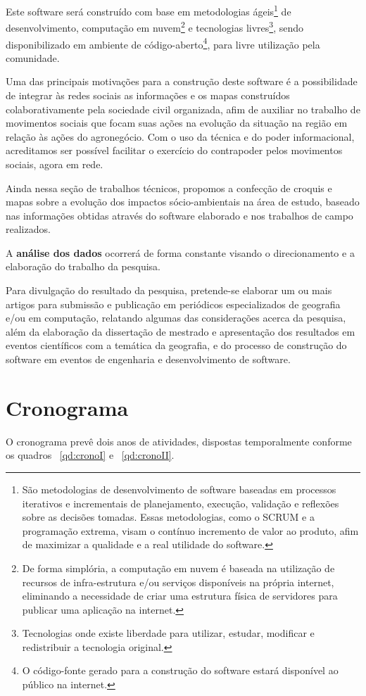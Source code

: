 Este software será construído com base em metodologias ágeis\footnote{São metodologias de desenvolvimento de software baseadas em processos iterativos e incrementais de planejamento, execução, validação e reflexões sobre as decisões tomadas. Essas metodologias, como o SCRUM e a programação extrema, visam o contínuo incremento de valor ao produto, afim de maximizar a qualidade e a real utilidade do software.} de desenvolvimento, computação em nuvem\footnote{De forma simplória, a computação em nuvem é baseada na utilização de recursos de infra-estrutura e/ou serviços disponíveis na própria internet, eliminando a necessidade de criar uma estrutura física de servidores para publicar uma aplicação na internet.} e tecnologias livres\footnote{Tecnologias onde existe liberdade para utilizar, estudar, modificar e redistribuir a tecnologia original.}, sendo disponibilizado em ambiente de código-aberto\footnote{O código-fonte gerado para a construção do software estará disponível ao público na internet.}, para livre utilização pela comunidade.

Uma das principais motivações para a construção deste software é a possibilidade de integrar às redes sociais as informações e os mapas construídos colaborativamente pela sociedade civil organizada, afim de auxiliar no trabalho de movimentos sociais que focam suas ações na evolução da situação na região em relação às ações do agronegócio. Com o uso da técnica e do poder informacional, acreditamos ser possível facilitar o exercício do contrapoder pelos movimentos sociais, agora em rede.

Ainda nessa seção de trabalhos técnicos, propomos a confecção de croquis e mapas sobre a evolução dos impactos sócio-ambientais na área de estudo, baseado nas informações obtidas através do software elaborado e nos trabalhos de campo realizados.

A \textbf{análise dos dados} ocorrerá de forma constante visando o direcionamento e a elaboração do trabalho da pesquisa. 

Para divulgação do resultado da pesquisa, pretende-se elaborar um ou mais artigos para submissão e publicação em periódicos especializados de geografia e/ou em computação, relatando algumas das considerações acerca da pesquisa, além da elaboração da dissertação de mestrado e apresentação dos resultados em eventos científicos com a temática da geografia, e do processo de construção do software em eventos de engenharia e desenvolvimento de software.

\section{Cronograma}

O cronograma prevê dois anos de atividades, dispostas temporalmente conforme os quadros ~\ref{qd:cronoI} e ~\ref{qd:cronoII}.





